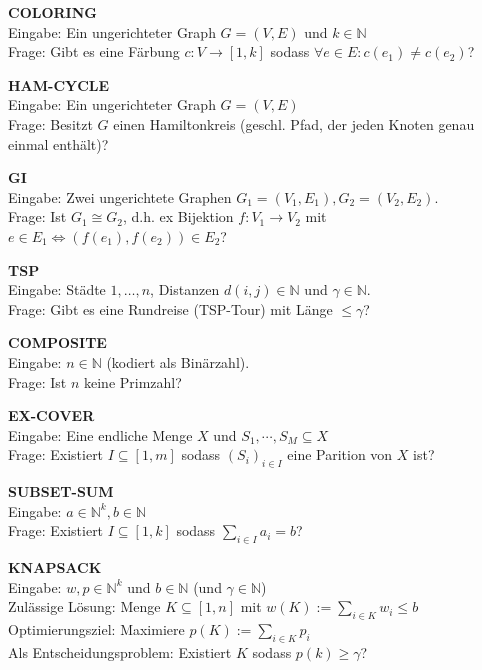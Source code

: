 \documentclass[a4paper,graphics,11pt]{article}
\begin{document}
\newpage

\textbf{COLORING}
\\[5pt]
Eingabe: Ein ungerichteter Graph $G = (V,E)$ und $k \in \mathbb{N}$
\\[5pt]
Frage: Gibt es eine Färbung $c : V \to [1,k]$ sodass $\forall e \in E : c(e_1) \neq c(e_2)$?

\strut

\textbf{HAM-CYCLE}
\\[5pt]
Eingabe: Ein ungerichteter Graph $G = (V,E)$
\\[5pt]
Frage: Besitzt $G$ einen Hamiltonkreis (geschl. Pfad, der jeden Knoten genau einmal enthält)?

\strut

\textbf{GI}
\\[5pt]
Eingabe: Zwei ungerichtete Graphen $G_1= (V_1,E_1), G_2=(V_2,E_2)$.
\\[5pt]
Frage: Ist $G_1 \cong G_2$, d.h. ex Bijektion $f:V_1 \to V_2$ mit $e \in E_1 \iff (f(e_1),f(e_2)) \in E_2$?

\strut

\textbf{TSP}
\\[5pt]
Eingabe: Städte $1,\dots,n$, Distanzen $d(i,j) \in \mathbb{N}$ und $\gamma \in \mathbb{N}$.
\\[5pt]
Frage: Gibt es eine Rundreise (TSP-Tour) mit Länge $\leq \gamma$?

\strut

\textbf{COMPOSITE}
\\[5pt]
Eingabe: $n \in \mathbb{N}$ (kodiert als Binärzahl).
\\[5pt]
Frage: Ist $n$ keine Primzahl?

\strut

\textbf{EX-COVER}
\\[5pt]
Eingabe: Eine endliche Menge $X$ und $S_1,\cdots,S_M \subseteq X$
\\[5pt]
Frage: Existiert $I \subseteq [1,m]$ sodass $(S_i)_{i \in I}$ eine Parition von $X$ ist?

\strut

\textbf{SUBSET-SUM}
\\[5pt]
Eingabe: $a \in \mathbb{N}^k, b \in \mathbb{N}$
\\[5pt]
Frage: Existiert $I \subseteq [1,k]$ sodass $\displaystyle \sum_{i \in I}a_i = b$?

\newpage

\textbf{KNAPSACK}
\\[10pt]
Eingabe: $w,p \in \mathbb{N}^k$ und $b\in \mathbb{N}$ (und $\gamma \in \mathbb{N}$)
\\[10pt]
Zulässige Lösung: Menge $K \subseteq [1,n]$ mit $w(K) := \sum_{i \in K} w_i \leq b$
\\[10pt]
Optimierungsziel: Maximiere $p(K) := \sum_{i \in K} p_i$
\\[10pt]
Als Entscheidungsproblem: Existiert $K$ sodass $p(k) \geq \gamma$?
\end{document}

